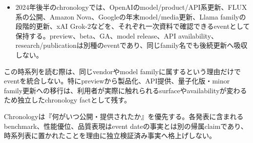 
\begin{itemize}
  \item 2024年後半のchronologyでは、OpenAIのmodel/product/API系更新、FLUX系の公開、Amazon Nova、Googleの年末model/media更新、Llama familyの段階的更新、xAI Grok-2などを、それぞれ一次資料で確認できるeventとして保持する。preview、beta、GA、model release、API availability、research/publicationは別種のeventであり、同じfamily名でも後続更新へ吸収しない。
\end{itemize}
\autocite{src-10b59b402b80,src-1572648d0de9,src-5db07766b472,src-6bbe9721db06,src-99e6401ec31b,src-bc9a95ff1e00,src-c3a08c57269d,src-e92e95daf8e0}

この時系列を読む際は、同じvendorやmodel familyに属するという理由だけでeventを統合しない。特にpreviewから製品化、API提供、量子化版・minor family更新への移行は、利用者が実際に触れられるsurfaceやavailabilityが変わるため独立したchronology factとして残す。\autocite{src-10b59b402b80,src-6bbe9721db06}


\begin{claimboundary}
Chronologyは『何がいつ公開・提供されたか』を優先する。各発表に含まれるbenchmark、性能優位、品質表現はevent dateの事実とは別の帰属claimであり、時系列表に置かれたことを理由に独立検証済み事実へ格上げしない。\autocite{src-bc9a95ff1e00}
\end{claimboundary}
